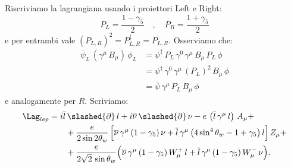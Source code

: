 Riscriviamo la lagrangiana usando i proiettori Left e Right:
\begin{equation}
    P_L = \frac{1 - \gamma_5}{2} \quad , \quad P_R = \frac{1 + \gamma_5}{2}
\end{equation}
e per entrambi vale $(P_{L,R})^2 = P_{L,R}^\dagger = P_{L,R}$. Osserviamo che:
\begin{align}
    \overline{\psi}_L\, (\gamma^\mu\, B_\mu)\, \phi_L &= \psi^\dagger\, P_L\, \gamma^0\, \gamma^\mu\, B_\mu\, P_L\, \phi \\
    &= \psi^\dagger\, \gamma^0\, \gamma^\mu\, (P_L)^2\, B_\mu\, \phi \\
    &= \overline{\psi}\, \gamma^\mu\, P_L\, B_\mu\, \phi
\end{align}
e analogamente per $R$. Scriviamo:
\begin{align}
    \Lag_{lep} &= i\overline{l}\, \slashed{\partial}\, l + i\overline{\nu}\, \slashed{\partial}\, \nu - e\, \left(\overline{l}\, \gamma^\mu\, l\right)\, A_\mu + \notag \\
    &\qquad + \frac{e}{2\sin{2\theta_w}}\, \Big[ \overline{\nu}\, \gamma^\mu\, (1-\gamma_5)\, \nu + \overline{l}\, \gamma^\mu\, \big( 4\sin^4\theta_w - 1 + \gamma_5 \big)\, l \Big]\, Z_\mu + \notag \\
    &\qquad + \frac{e}{2\sqrt{2}\, \sin\theta_w}\Big( \overline{\nu}\, \gamma^\mu\, (1-\gamma_5)\, W_\mu^+\, l + \overline{l}\, \gamma^\mu\, (1-\gamma_5)\, W_\mu^-\, \nu \Big).
\end{align}


